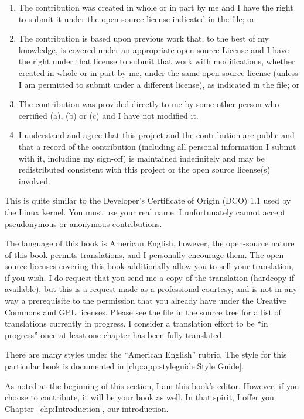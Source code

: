 \begin{enumerate}[label={(\alph*)}]
\item	The contribution was created in whole or in part
	by me and I have the right to submit it under
	the open source license indicated in the file; or
\item	The contribution is based upon previous work
	that, to the best of my knowledge, is covered
	under an appropriate open source License and I
	have the right under that license to submit that
	work with modifications, whether created in whole
	or in part by me, under the same open source
	license (unless I am permitted to submit under
	a different license), as indicated in the file; or
\item	The contribution was provided directly to me by
	some other person who certified (a), (b) or (c)
	and I have not modified it.
\item	I understand and agree that this project and the
	contribution are public and that a record of the
	contribution (including all personal information
	I submit with it, including my sign-off) is
	maintained indefinitely and may be redistributed
	consistent with this project or the open source
	license(s) involved.
\end{enumerate}

This is quite similar to the Developer's Certificate of Origin (DCO)
1.1 used by the Linux kernel.
You must use your real name:  I unfortunately cannot accept pseudonymous or
anonymous contributions.

The language of this book is American English, however, the open-source
nature of this book permits translations, and I personally encourage them.
The open-source licenses covering this book additionally allow you
to sell your translation, if you wish.
I do request that you send me a copy of the translation (hardcopy if
available), but this is a request made as a professional courtesy,
and is not in any way a prerequisite to the permission that you already
have under the Creative Commons and GPL licenses.
Please see the  file in the source tree for a list of
translations currently in progress.
I consider a translation effort to be ``in progress'' once at least one
chapter has been fully translated.

There are many styles under the ``American English'' rubric.
The style for this particular book is documented in
\cref{chp:app:styleguide:Style Guide}.

As noted at the beginning of this section, I am this book's editor.
However, if you choose to contribute, it will be your book as well.
In that spirit, I offer you Chapter~\ref{chp:Introduction}, our introduction.

